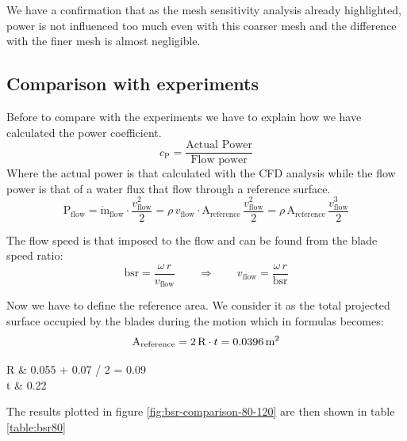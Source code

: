 \documentclass[a4paper,12pt]{article}
\begin{document}
We have a confirmation that as the mesh sensitivity analysis already highlighted, power is not influenced too much even with this coarser mesh and the difference with the finer mesh is almost negligible.

\subsection{Comparison with experiments}

Before to compare with the experiments we have to explain how we have calculated the power coefficient.
\begin{equation}
c_\text{P} = \dfrac{\text{Actual Power}}{\text{Flow power}}
\end{equation}
Where the actual power is that calculated with the CFD analysis while the flow power is that of a water flux that flow through a reference surface. 
\begin{equation}
\text{P}_\text{flow} 
= \dot{\text{m}}_\text{flow} \cdot \dfrac{v^2_\text{flow}}{2} 
= \rho \, v_\text{flow} \cdot \text{A}_\text{reference} \, \dfrac{v^2_\text{flow}}{2} 
= \rho \, \text{A}_\text{reference} \, \dfrac{v^3_\text{flow}}{2}
\end{equation}

The flow speed is that imposed to the flow and can be found from the blade speed ratio:
\begin{equation}
\text{bsr} = \dfrac{\omega \, r}{v_\text{flow}} \quad \quad \Rightarrow \quad \quad v_\text{flow} = \dfrac{\omega \, r}{\text{bsr} }
\end{equation}

Now we have to define the reference area. We consider it as the total projected surface occupied by the blades during the motion which in formulas becomes:
\begin{equation}
\text{A}_\text{reference} = 2\, \text{R} \cdot t = 0.0396 \,\text{m}^2
\end{equation}
\begin{conditions}
R & 0.055 + 0.07 / 2 = 0.09 \m  {} \\
t & 0.22 \m {}
\end{conditions}

The results plotted in figure \ref{fig:bsr-comparison-80-120} are then shown in table \ref{table:bsr80}
\end{document}

